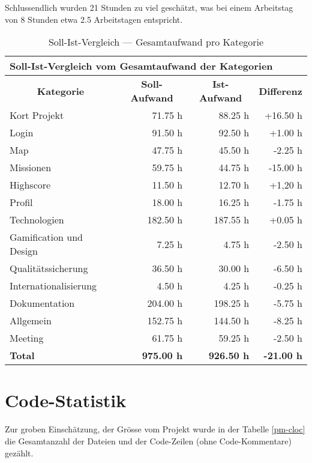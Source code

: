 Schlussendlich wurden 21 Stunden zu viel geschätzt, was bei einem Arbeitstag von 8 Stunden etwa 2.5 Arbeitstagen entspricht. 


\begin{table}[H]
\centering
\label{pm-arbeitsaufwand-kategorie-ges}
\begin{tabular}{|l|r|r|r|}
\hline
\multicolumn{4}{|l|}{\textbf{Soll-Ist-Vergleich vom Gesamtaufwand der Kategorien}} \\
\hline
\multicolumn{1}{|c|}{\textbf{Kategorie}} & \multicolumn{1}{|c|}{\textbf{Soll-Aufwand}} & \multicolumn{1}{|c|}{\textbf{Ist-Aufwand}} & \multicolumn{1}{|c|}{\textbf{Differenz}}\\
\hline
Kort Projekt & 71.75 h & 88.25 h & +16.50 h \\
\hline
Login & 91.50 h & 92.50 h & +1.00 h \\
\hline
Map & 47.75	h & 45.50 h & -2.25 h \\
\hline
Missionen & 59.75 h & 44.75 h & -15.00 h \\
\hline
Highscore & 11.50 h & 12.70 h & +1,20 h \\
\hline
Profil & 18.00 h & 16.25 h & -1.75 h \\
\hline
Technologien & 182.50 h & 187.55 h & +0.05 h \\
\hline
Gamification und Design & 7.25 h & 4.75 h & -2.50 h \\
\hline
Qualitätssicherung & 36.50 h & 30.00 h & -6.50 h \\
\hline
Internationalisierung & 4.50 h & 4.25 h & -0.25 h \\
\hline
Dokumentation & 204.00 h & 198.25 h & -5.75 h \\
\hline
Allgemein & 152.75 h & 144.50 h & -8.25 h \\
\hline
Meeting & 61.75 h & 59.25 h & -2.50 h \\
\hline
\textbf{Total} & \textbf{975.00 h} & \textbf{926.50 h} & \textbf{-21.00 h} \\
\hline
\end{tabular}
\caption{Soll-Ist-Vergleich --- Gesamtaufwand pro Kategorie}
\end{table}

\section{Code-Statistik}
Zur groben Einschätzung, der Grösse vom Projekt wurde in der Tabelle \ref{pm-cloc} die Gesamtanzahl der Dateien und der Code-Zeilen (ohne Code-Kommentare) gezählt.

